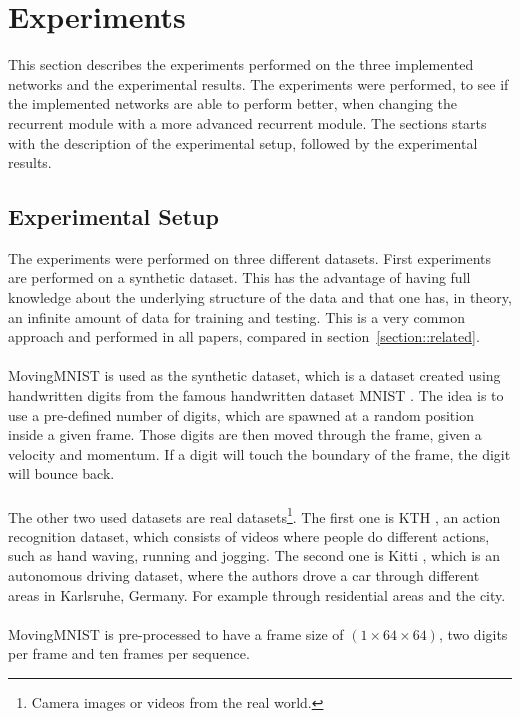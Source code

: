 \section{Experiments} \label{section::experiments}
 This section describes the experiments performed on the three implemented networks and the experimental results. The experiments were performed, to see 
 if the implemented networks are able to perform better, when changing the recurrent module with a more advanced recurrent module. The sections starts with 
 the description of the experimental setup, followed by the experimental results.
 
 \subsection{Experimental Setup} \label{subsection::exp_setup}
  The experiments were performed on three different datasets. First experiments are performed on a synthetic dataset. This has the advantage of having full 
  knowledge
  about the underlying structure of the data and that one has, in theory, an infinite amount of data for training and testing. This is a very common approach
  and performed in all papers, compared in section~\ref{section::related}.
  \\\\
  MovingMNIST is used as the synthetic dataset, which is a dataset created using handwritten digits from the famous handwritten dataset MNIST
  \cite{LeCun1998}. The idea is to use a pre-defined number of digits, which are spawned at a random position inside a given frame. Those digits are then moved 
  through the frame, given a velocity and momentum. If a digit will touch the boundary of the frame, the digit will bounce back.
  \\\\  
  The other two used datasets are real datasets\footnote{Camera images or videos from the real world.}.
  The first one is KTH \cite{Schuldt2004}, an action recognition dataset, which consists of videos where people
  do different actions, such as hand waving, running and jogging. The second one is Kitti \cite{Geiger2013}, which is an autonomous driving dataset, where
  the authors drove a car through different areas in Karlsruhe, Germany. For example through residential areas and the city.
  \\\\
  MovingMNIST is pre-processed to have a frame size of $(1 \times 64 \times 64)$, two digits per frame and ten frames per sequence.
